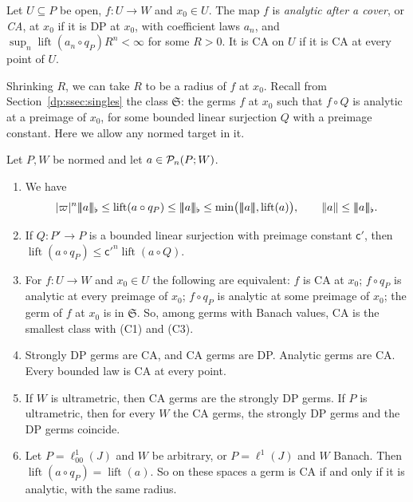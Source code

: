 \begin{definition}\label{dp:def:ca}
Let $U\subseteq P$ be open, $f\colon U\to W$ and $x_0\in U$. The map $f$ is \emph{analytic after a cover}, or \emph{CA}, at $x_0$ if it is DP at $x_0$, with coefficient laws $a_n$, and $\sup_n\operatorname{lift}(a_n\circ q_P)R^n<\infty$ for some $R>0$. It is CA on $U$ if it is CA at every point of $U$.
\end{definition}

Shrinking $R$, we can take $R$ to be a radius of $f$ at $x_0$. Recall from Section~\ref{dp:ssec:singles} the class $\mathfrak S$: the germs $f$ at $x_0$ such that $f\circ Q$ is analytic at a preimage of $x_0$, for some bounded linear surjection $Q$ with a preimage constant. Here we allow any normed target in it.

\begin{lemma}\label{dp:lem:cover-flat}
Let $P,W$ be normed and let $a\in\mathcal P_n(P;W)$.
\begin{enumerate}
\item We have
\[
 \abs\varpi^n\lvert\!\lvert\!\lvert a\rvert\!\rvert\!\rvert_\flat\le\operatorname{lift}(a\circ q_P)\le\lvert\!\lvert\!\lvert a\rvert\!\rvert\!\rvert_\flat\le\min\bigl(\lvert\!\lvert\!\lvert a\rvert\!\rvert\!\rvert,\operatorname{lift}(a)\bigr),\qquad\norm a\le\lvert\!\lvert\!\lvert a\rvert\!\rvert\!\rvert_\flat.
\]
\item If $Q\colon P'\to P$ is a bounded linear surjection with preimage constant $\mathsf c'$, then $\operatorname{lift}(a\circ q_P)\le\mathsf c'^n\operatorname{lift}(a\circ Q)$.
\item For $f\colon U\to W$ and $x_0\in U$ the following are equivalent: $f$ is CA at $x_0$; $f\circ q_P$ is analytic at every preimage of $x_0$; $f\circ q_P$ is analytic at some preimage of $x_0$; the germ of $f$ at $x_0$ is in $\mathfrak S$. So, among germs with Banach values, CA is the smallest class with \textup{(C1)} and \textup{(C3)}.
\item Strongly DP germs are CA, and CA germs are DP. Analytic germs are CA. Every bounded law is CA at every point.
\item If $W$ is ultrametric, then CA germs are the strongly DP germs. If $P$ is ultrametric, then for every $W$ the CA germs, the strongly DP germs and the DP germs coincide.
\item Let $P=\ell^1_{00}(J)$ and $W$ be arbitrary, or $P=\ell^1(J)$ and $W$ Banach. Then $\operatorname{lift}(a\circ q_P)=\operatorname{lift}(a)$. So on these spaces a germ is CA if and only if it is analytic, with the same radius.
\end{enumerate}
\end{lemma}

